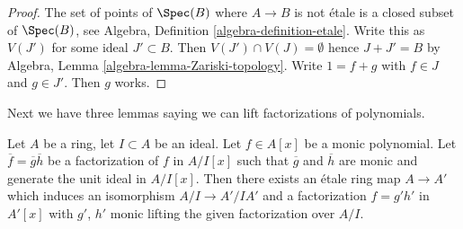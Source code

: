 \begin{proof}
The set of points of $\Spec(B)$ where $A \to B$ is not \'etale is a
closed subset of $\Spec(B)$, see
Algebra, Definition \ref{algebra-definition-etale}.
Write this as $V(J')$ for some ideal $J' \subset B$. Then
$V(J') \cap V(J) = \emptyset$ hence $J + J' = B$ by
Algebra, Lemma \ref{algebra-lemma-Zariski-topology}.
Write $1 = f + g$ with $f \in J$ and $g \in J'$.
Then $g$ works.
\end{proof}

\noindent
Next we have three lemmas saying we can lift factorizations of
polynomials.

\begin{lemma}
\label{lemma-lift-factorization-monic}
Let $A$ be a ring, let $I \subset A$ be an ideal. Let $f \in A[x]$ be a
monic polynomial. Let $\overline{f} = \overline{g} \overline{h}$ be a
factorization of $f$ in $A/I[x]$ such that $\overline{g}$ and $\overline{h}$
are monic and generate the unit ideal in $A/I[x]$. Then there exists an
\'etale ring map $A \to A'$ which induces an isomorphism $A/I \to A'/IA'$
and a factorization $f = g' h'$ in $A'[x]$ with $g'$, $h'$ monic
lifting the given factorization over $A/I$.
\end{lemma}

